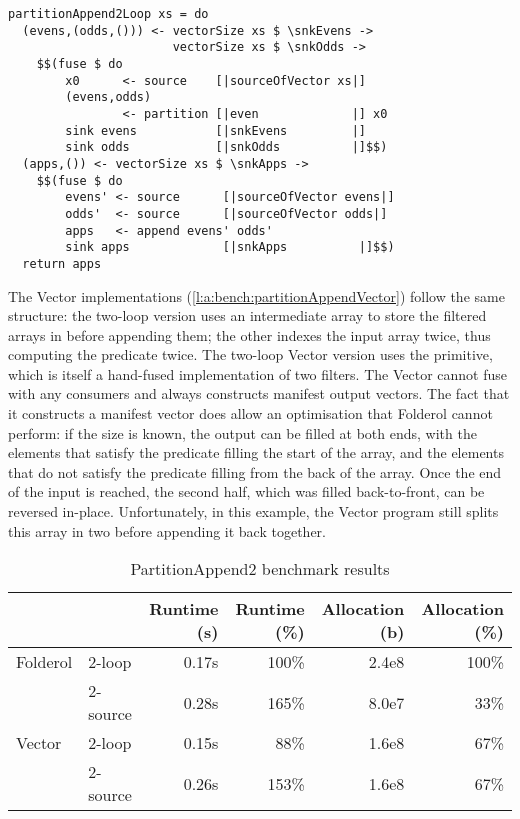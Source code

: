 \begin{lstlisting}[float,label=l:bench:partitionAppend2Loop,caption=Partition / append with two loops]
partitionAppend2Loop xs = do
  (evens,(odds,())) <- vectorSize xs $ \snkEvens ->
                       vectorSize xs $ \snkOdds ->
    $$(fuse $ do
        x0      <- source    [|sourceOfVector xs|]
        (evens,odds)
                <- partition [|even             |] x0
        sink evens           [|snkEvens         |]
        sink odds            [|snkOdds          |]$$)
  (apps,()) <- vectorSize xs $ \snkApps ->
    $$(fuse $ do
        evens' <- source      [|sourceOfVector evens|]
        odds'  <- source      [|sourceOfVector odds|]
        apps   <- append evens' odds'
        sink apps             [|snkApps          |]$$)
  return apps
\end{lstlisting}

The Vector implementations (\cref{l:a:bench:partitionAppendVector}) follow the same structure: the two-loop version uses an intermediate array to store the filtered arrays in before appending them; the other indexes the input array twice, thus computing the predicate twice.
The two-loop Vector version uses the \Hs@partition@ primitive, which is itself a hand-fused implementation of two filters.
The Vector \Hs@partition@ cannot fuse with any consumers and always constructs manifest output vectors.
The fact that it constructs a manifest vector does allow an optimisation that Folderol cannot perform: if the size is known, the output can be filled at both ends, with the elements that satisfy the predicate filling the start of the array, and the elements that do not satisfy the predicate filling from the back of the array.
Once the end of the input is reached, the second half, which was filled back-to-front, can be reversed in-place.
Unfortunately, in this example, the Vector program still splits this array in two before appending it back together.

\begin{table}
\begin{center}
\begin{tabular}{ll|rrrr}
& & Runtime (s)  & Runtime (\%) & Allocation (b) & Allocation (\%) \\
\hline
Folderol & 2-loop   & 0.17s &   100\% & 2.4e8 & 100\% \\
         & 2-source & 0.28s &   165\% & 8.0e7 &  33\% \\
Vector   & 2-loop   & 0.15s &    88\% & 1.6e8 &  67\% \\
         & 2-source & 0.26s &   153\% & 1.6e8 &  67\% \\
\end{tabular}
\end{center}
\caption[PartitionAppend2 benchmark results]{PartitionAppend2 benchmark results}
\label{table:bench:part2app2}
\end{table}

